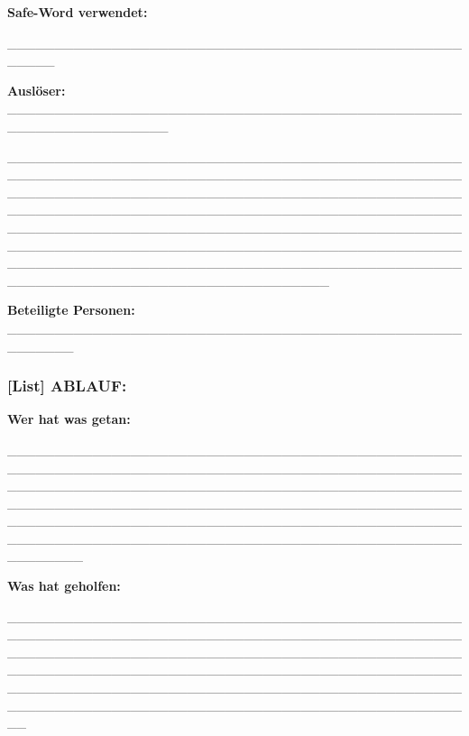 \textbf{Safe-Word verwendet:}

\_\_\_\_\_\_\_\_\_\_\_\_\_\_\_\_\_\_\_\_\_\_\_\_\_\_\_\_\_\_\_\_\_\_\_\_\_\_\_\_\_\_\_\_\_\_\_\_\_\_\_\_\_

\textbf{Auslöser:} \_\_\_\_\_\_\_\_\_\_\_\_\_\_\_\_\_\_\_\_\_\_\_\_\_\_\_\_\_\_\_\_\_\_\_\_\_\_\_\_\_\_\_\_\_\_\_\_\_\_\_\_\_\_\_\_\_\_\_\_\_\_\_\_\_

\_\_\_\_\_\_\_\_\_\_\_\_\_\_\_\_\_\_\_\_\_\_\_\_\_\_\_\_\_\_\_\_\_\_\_\_\_\_\_\_\_\_\_\_\_\_\_\_\_\_\_\_\_\_\_\_\_\_\_\_\_\_\_\_\_\_\_\_\_\_\_\_\_\_\_\_\_\_\_\_\_\_\_\_\_\_\_\_\_\_\_\_\_\_\_\_\_\_\_\_\_\_\_\_\_\_\_\_\_\_\_\_\_\_\_\_\_\_\_\_\_\_\_\_\_\_\_\_\_\_\_\_\_\_\_\_\_\_\_\_\_\_\_\_\_\_\_\_\_\_\_\_\_\_\_\_\_\_\_\_\_\_\_\_\_\_\_\_\_\_\_\_\_\_\_\_\_\_\_\_\_\_\_\_\_\_\_\_\_\_\_\_\_\_\_\_\_\_\_\_\_\_\_\_\_\_\_\_\_\_\_\_\_\_\_\_\_\_\_\_\_\_\_\_\_\_\_\_\_\_\_\_\_\_\_\_\_\_\_\_\_\_\_\_\_\_\_\_\_\_\_\_\_\_\_\_\_\_\_\_\_\_\_\_\_\_\_\_\_\_\_\_\_\_\_\_\_\_\_\_\_\_\_\_\_\_\_\_\_\_\_\_\_\_\_\_\_\_\_\_\_\_\_\_\_\_\_\_\_\_\_\_\_\_\_\_\_\_\_\_\_\_\_\_\_\_\_\_\_\_\_\_\_\_\_\_\_\_\_\_\_\_\_\_\_\_\_\_\_\_\_\_\_\_\_\_\_\_\_\_\_\_\_\_\_\_\_\_\_\_

\textbf{Beteiligte Personen:} \_\_\_\_\_\_\_\_\_\_\_\_\_\_\_\_\_\_\_\_\_\_\_\_\_\_\_\_\_\_\_\_\_\_\_\_\_\_\_\_\_\_\_\_\_\_\_\_\_\_\_\_\_\_\_

\hypertarget{ablauf}{%
\subsubsection{\texorpdfstring{\textbf{[List] ABLAUF:}}{[List] ABLAUF:}}\label{ablauf}}

\textbf{Wer hat was getan:}

\_\_\_\_\_\_\_\_\_\_\_\_\_\_\_\_\_\_\_\_\_\_\_\_\_\_\_\_\_\_\_\_\_\_\_\_\_\_\_\_\_\_\_\_\_\_\_\_\_\_\_\_\_\_\_\_\_\_\_\_\_\_\_\_\_\_\_\_\_\_\_\_\_\_\_\_\_\_\_\_\_\_\_\_\_\_\_\_\_\_\_\_\_\_\_\_\_\_\_\_\_\_\_\_\_\_\_\_\_\_\_\_\_\_\_\_\_\_\_\_\_\_\_\_\_\_\_\_\_\_\_\_\_\_\_\_\_\_\_\_\_\_\_\_\_\_\_\_\_\_\_\_\_\_\_\_\_\_\_\_\_\_\_\_\_\_\_\_\_\_\_\_\_\_\_\_\_\_\_\_\_\_\_\_\_\_\_\_\_\_\_\_\_\_\_\_\_\_\_\_\_\_\_\_\_\_\_\_\_\_\_\_\_\_\_\_\_\_\_\_\_\_\_\_\_\_\_\_\_\_\_\_\_\_\_\_\_\_\_\_\_\_\_\_\_\_\_\_\_\_\_\_\_\_\_\_\_\_\_\_\_\_\_\_\_\_\_\_\_\_\_\_\_\_\_\_\_\_\_\_\_\_\_\_\_\_\_\_\_\_\_\_\_\_\_\_

\textbf{Was hat geholfen:}

\_\_\_\_\_\_\_\_\_\_\_\_\_\_\_\_\_\_\_\_\_\_\_\_\_\_\_\_\_\_\_\_\_\_\_\_\_\_\_\_\_\_\_\_\_\_\_\_\_\_\_\_\_\_\_\_\_\_\_\_\_\_\_\_\_\_\_\_\_\_\_\_\_\_\_\_\_\_\_\_\_\_\_\_\_\_\_\_\_\_\_\_\_\_\_\_\_\_\_\_\_\_\_\_\_\_\_\_\_\_\_\_\_\_\_\_\_\_\_\_\_\_\_\_\_\_\_\_\_\_\_\_\_\_\_\_\_\_\_\_\_\_\_\_\_\_\_\_\_\_\_\_\_\_\_\_\_\_\_\_\_\_\_\_\_\_\_\_\_\_\_\_\_\_\_\_\_\_\_\_\_\_\_\_\_\_\_\_\_\_\_\_\_\_\_\_\_\_\_\_\_\_\_\_\_\_\_\_\_\_\_\_\_\_\_\_\_\_\_\_\_\_\_\_\_\_\_\_\_\_\_\_\_\_\_\_\_\_\_\_\_\_\_\_\_\_\_\_\_\_\_\_\_\_\_\_\_\_\_\_\_\_\_\_\_\_\_\_\_\_\_\_\_\_\_\_\_\_\_\_\_\_\_\_\_\_\_\_\_\_

